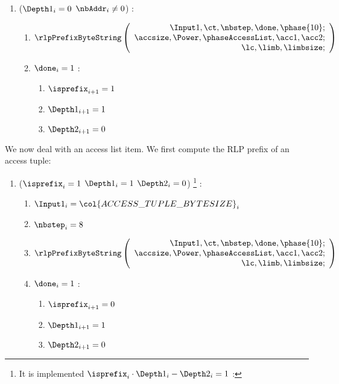 \begin{enumerate}[resume]
	\item \If ($\Depth 1_{i}=0$ \et $\nbAddr_{i} \ne 0$) \Then:
	\begin{enumerate}
	    \item 
			\[
				\rlpPrefixByteString
				\left( \begin{array}{r}
					\Input1,
					\ct,
					\nbstep,
					\done,
					\phase{10}; \\
					\accsize,
					\Power,
					\phaseAccessList,
					\acc1,
					\acc2; \\
					\lc,
					\limb,
					\limbsize; \\
				\end{array} \right)
			\]
	     \item \If $\done_{i}=1$ \Then:
	     \begin{enumerate} 
		 	\item $\isprefix_{i+1}=1$
		 	\item $\Depth1_{i+1}=1$
		 	\item $\Depth2_{i+1}=0$	
	     \end{enumerate}
	\end{enumerate}
\end{enumerate}
We now deal with an access list item. We first compute the RLP prefix of an access tuple:
\begin{enumerate}[resume]
	\item \If ($\isprefix_{i}=1$ \et $\Depth1_{i}=1$ \et $\Depth2_{i}=0$) \footnote{It is implemented \If $\isprefix_{i} \cdot \Depth1_{i} - \Depth2_{i}=1$ \Then:} \Then:
	\begin{enumerate}
		\item $\Input1_{i} = \col{ACCESS\_TUPLE\_BYTESIZE}_{i}$
		\item $\nbstep_{i}=8$
		\item 
			\[
				\rlpPrefixByteString
				\left( \begin{array}{r}
					\Input1,
					\ct,
					\nbstep,
					\done,
					\phase{10}; \\
					\accsize,
					\Power,
					\phaseAccessList,
					\acc1,
					\acc2; \\
					\lc,
					\limb,
					\limbsize; \\
				\end{array} \right)
			\]
		\item \If $\done_{i}=1$ \Then:
		\begin{enumerate}
		 	\item $\isprefix_{i+1}=0$
		 	\item $\Depth1_{i+1}=1$
		 	\item $\Depth2_{i+1}=0$ 
		\end{enumerate}
	\end{enumerate}
\end{enumerate}
